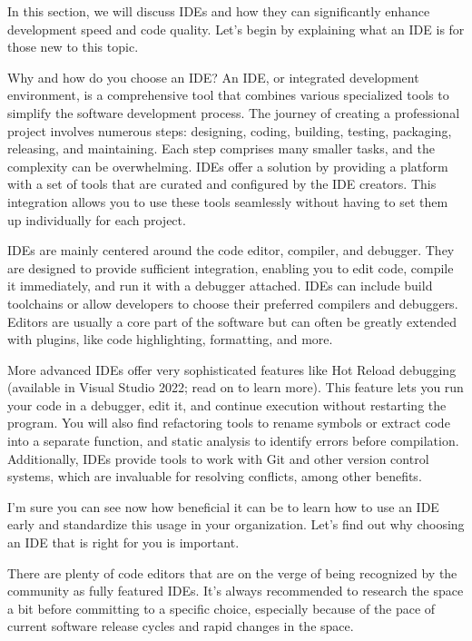 In this section, we will discuss IDEs and how they can significantly enhance development speed and code quality. Let’s begin by explaining what an IDE is for those new to this topic.

Why and how do you choose an IDE? An IDE, or integrated development environment, is a comprehensive tool that combines various specialized tools to simplify the software development process. The journey of creating a professional project involves numerous steps: designing, coding, building, testing, packaging, releasing, and maintaining. Each step comprises many smaller tasks, and the complexity can be overwhelming. IDEs offer a solution by providing a platform with a set of tools that are curated and configured by the IDE creators. This integration allows you to use these tools seamlessly without having to set them up individually for each project.

IDEs are mainly centered around the code editor, compiler, and debugger. They are designed to provide sufficient integration, enabling you to edit code, compile it immediately, and run it with a debugger attached. IDEs can include build toolchains or allow developers to choose their preferred compilers and debuggers. Editors are usually a core part of the software but can often be greatly extended with plugins, like code highlighting, formatting, and more.

More advanced IDEs offer very sophisticated features like Hot Reload debugging (available in Visual Studio 2022; read on to learn more). This feature lets you run your code in a debugger, edit it, and continue execution without restarting the program. You will also find refactoring tools to rename symbols or extract code into a separate function, and static analysis to identify errors before compilation. Additionally, IDEs provide tools to work with Git and other version control systems, which are invaluable for resolving conflicts, among other benefits.

I’m sure you can see now how beneficial it can be to learn how to use an IDE early and standardize this usage in your organization. Let’s find out why choosing an IDE that is right for you is important.


There are plenty of code editors that are on the verge of being recognized by the community as fully featured IDEs. It’s always recommended to research the space a bit before committing to a specific choice, especially because of the pace of current software release cycles and rapid changes in the space.

